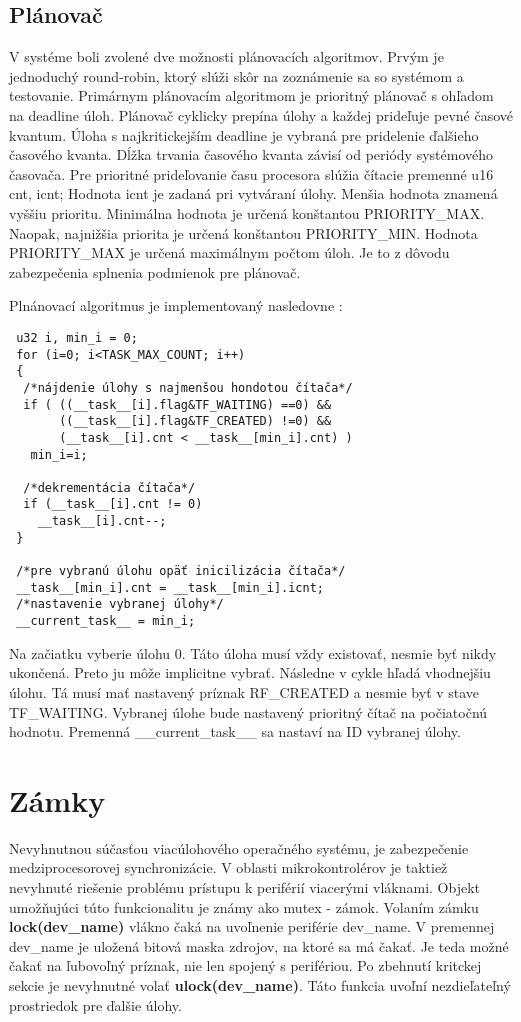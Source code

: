 \subsection{Plánovač}

V systéme boli zvolené dve možnosti plánovacích algoritmov. Prvým je jednoduchý round-robin, ktorý slúži skôr na zoznámenie sa so systémom a testovanie. Primárnym plánovacím algoritmom je prioritný plánovač s ohľadom na deadline úloh. Plánovač cyklicky prepína úlohy a každej prideľuje pevné časové kvantum. Úloha s najkritickejším deadline je vybraná pre pridelenie ďalšieho časového kvanta. Dĺžka trvania časového kvanta závisí od periódy systémového časovača. Pre prioritné prideľovanie času procesora slúžia čítacie premenné u16 cnt, icnt; Hodnota icnt je zadaná pri vytváraní úlohy. Menšia hodnota znamená vyššiu prioritu. Minimálna hodnota je určená konštantou PRIORITY\_MAX. Naopak, najnižšia priorita je určená konštantou PRIORITY\_MIN. Hodnota PRIORITY\_MAX je určená maximálnym počtom úloh. Je to z dôvodu zabezpečenia splnenia podmienok pre plánovač.

Plnánovací algoritmus je implementovaný nasledovne :
{\small
\begin{verbatim}
 u32 i, min_i = 0;
 for (i=0; i<TASK_MAX_COUNT; i++)		
 {
  /*nájdenie úlohy s najmenšou hondotou čítača*/
  if ( ((__task__[i].flag&TF_WAITING) ==0) && 
       ((__task__[i].flag&TF_CREATED) !=0) && 
       (__task__[i].cnt < __task__[min_i].cnt) )
   min_i=i;

  /*dekrementácia čítača*/
  if (__task__[i].cnt != 0)
    __task__[i].cnt--;
 }

 /*pre vybranú úlohu opäť inicilizácia čítača*/
 __task__[min_i].cnt = __task__[min_i].icnt;
 /*nastavenie vybranej úlohy*/
 __current_task__ = min_i;
\end{verbatim}
}

Na začiatku vyberie úlohu 0. Táto úloha musí vždy existovať, nesmie byť nikdy ukončená. Preto ju môže implicitne vybrať. Následne v cykle hľadá vhodnejšiu úlohu. Tá musí mať nastavený príznak RF\_CREATED a nesmie byť v stave TF\_WAITING. Vybranej úlohe bude nastavený prioritný čítač na počiatočnú hodnotu. Premenná  \_\_current\_task\_\_ sa nastaví na ID vybranej úlohy.

\section{Zámky}

Nevyhnutnou súčasťou viacúlohového operačného systému, je zabezpečenie medziprocesorovej synchronizácie. V oblasti mikrokontrolérov je taktiež nevyhnuté riešenie problému prístupu k periférií viacerými vláknami. Objekt umožňujúci túto funkcionalitu je známy ako mutex - zámok. Volaním zámku \textbf{lock(dev\_name)} vlákno čaká na uvoľnenie periférie dev\_name. V premennej dev\_name je uložená bitová maska zdrojov, na ktoré sa má čakať. Je teda možné čakať na ľubovoľný príznak, nie len spojený s perifériou. Po zbehnutí kritckej sekcie je nevyhnutné volať \textbf{ulock(dev\_name)}. Táto funkcia uvoľní nezdieľateľný prostriedok pre ďalšie úlohy.

